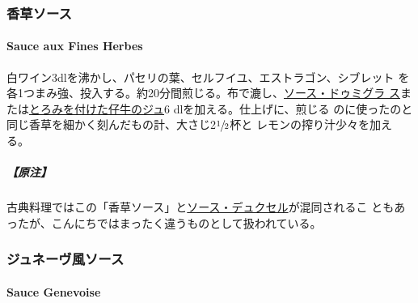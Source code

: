 \maeaki

\hypertarget{ux9999ux8349ux30bdux30fcux30b9}{%
\subsubsection{香草ソース}\label{ux9999ux8349ux30bdux30fcux30b9}}

\hypertarget{sauce-aux-fines-herbes}{%
\paragraph{Sauce aux Fines Herbes}\label{sauce-aux-fines-herbes}}


白ワイン3dlを沸かし、パセリの葉、セルフイユ、エストラゴン、シブレット
を各1つまみ強、投入する。約20分間煎じる。布で漉し、\protect\hyperlink{sauce-demi-glace}{ソース・ドゥミグラ
ス}または\protect\hyperlink{jus-de-veau-lie}{とろみを付けた仔牛のジュ}6
dlを加える。仕上げに、煎じる
のに使ったのと同じ香草を細かく刻んだもの計、大さじ2\(\sfrac{1}{2}\)杯と
レモンの搾り汁少々を加える。

\hypertarget{ux539fux6ce8-2}{%
\subparagraph{【原注】}\label{ux539fux6ce8-2}}

古典料理ではこの「香草ソース」と\protect\hyperlink{sauce-duxelles}{ソース・デュクセル}が混同されるこ
ともあったが、こんにちではまったく違うものとして扱われている。

\maeaki

\hypertarget{ux30b8ux30e5ux30cdux30fcux30f4ux98a8ux30bdux30fcux30b9}{%
\subsubsection{ジュネーヴ風ソース}\label{ux30b8ux30e5ux30cdux30fcux30f4ux98a8ux30bdux30fcux30b9}}

\hypertarget{sauce-genevoise}{%
\paragraph{Sauce Genevoise}\label{sauce-genevoise}}


